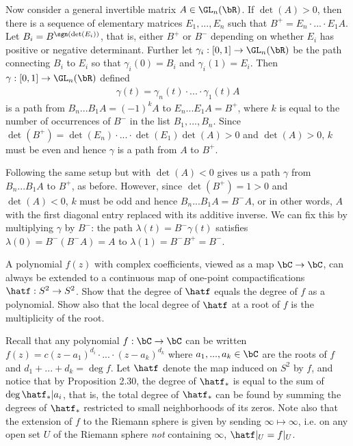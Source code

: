 \begin{homework}[e]
\begin{prf}
  \bigskip

  Now consider a general invertible matrix $A \in \GL_n(\bR)$. If $\det(A) > 0$, then there is a sequence of elementary matrices $E_1,...,E_n$ such that $B^+ = E_n\cdot ... \cdot E_1A$. Let $B_i = B^{\sgn(\det(E_i))}$, that is, either $B^+$ or $B^-$ depending on whether $E_i$ has positive or negative determinant. Further let $\gamma_i:[0,1]\to \GL_n(\bR)$ be the path connecting $B_i$ to $E_i$ so that $\gamma_i(0) = B_i$ and $\gamma_i(1) = E_i$. Then $\gamma:[0,1]\to \GL_n(\bR)$ defined
  \begin{align*}
    \gamma(t) = \gamma_n(t)\cdot...\cdot\gamma_1(t)A
  \end{align*}
  is a path from $B_n...B_1A = (-1)^kA$ to $E_n...E_1A = B^+$, where $k$ is equal to the number of occurrences of $B^-$ in the list $B_1,...,B_n$. Since $\det(B^+) = \det(E_n)\cdot ...\cdot \det(E_1)\det (A) > 0$ and $\det(A) > 0$, $k$ must be even and hence $\gamma$ is a path from $A$ to $B^+$.

  Following the same setup but with $\det(A) < 0$ gives us a path $\gamma$ from $B_n...B_1A$ to $B^+$, as before. However, since $\det(B^+) = 1 > 0$ and $\det(A) < 0$, $k$ must be odd and hence $B_n...B_1A = B^- A$, or in other words, $A$ with the first diagonal entry replaced with its additive inverse. We can fix this by multiplying $\gamma$ by $B^-$: the path $\lambda(t) = B^-\gamma(t)$ satisfies $\lambda(0) = B^-(B^-A) = A$ to $\lambda(1) = B^-B^+ = B^-$.
  \end{prf}
   A polynomial $f(z)$ with complex coefficients, viewed as a map $\bC\to \bC$, can always be extended to a continuous map of one-point compactifications $\hatf:S^2 \to S^2$. Show that the degree of $\hatf$ equals the degree of $f$ as a  polynomial. Show also that the local degree of $\hatf$ at a root of $f$ is the multiplicity of the root.
  \begin{prf}
    Recall that any polynomial $f:\bC\to \bC$ can be written $f(z) = c(z - a_1)^{d_i}\cdot ... \cdot (z - a_k)^{d_k}$ where $a_1,...,a_k\in \bC$ are the roots of $f$ and $d_1 + ... + d_k = \deg f$. Let $\hatf$ denote the map induced on $S^2$ by $f$, and notice that by Proposition 2.30, the degree of $\hatf_*$ is equal to the sum of $\deg \hatf_* | a_i$, that is, the total degree of $\hatf_*$ can be found by summing the degrees of $\hatf_*$ restricted to small neighborhoods of its zeros. Note also that the extension of $f$ to the Riemann sphere is given by sending $\infty \mapsto \infty$, i.e. on any open set $U$ of the Riemann sphere \emph{not} containing $\infty$, $\hatf|_U = f|_U$.


\end{prf}
\end{homework}

